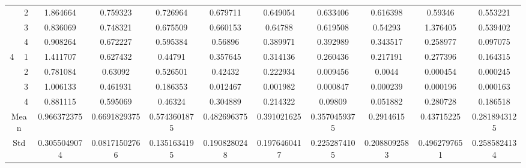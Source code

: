 \documentclass[draft,dvipsnames]{drexel-thesis}
\begin{document}
\begin{thesis}
\begin{table}[!t]
{\begin{tabular}{|c|c|c|c|c|c|c|c|c|c|c|}
                      & 2                   & 1.864664     & 0.759323      & 0.726964     & 0.679711     & 0.649054     & 0.633406     & 0.616398     & 0.59346      & 0.553221     \\ \cline{2-11}
                      & 3                   & 0.836069     & 0.748321      & 0.675509     & 0.660153     & 0.64788      & 0.619508     & 0.54293      & 1.376405     & 0.539402     \\ \cline{2-11}
                      & 4                   & 0.908264     & 0.672227      & 0.595384     & 0.56896      & 0.389971     & 0.392989     & 0.343517     & 0.258977     & 0.097075     \\ \hline
\multirow{4}{*}{4}    & 1                   & 1.411707     & 0.627432      & 0.44791      & 0.357645     & 0.314136     & 0.260436     & 0.217191     & 0.277396     & 0.164315     \\ \cline{2-11}
                      & 2                   & 0.781084     & 0.63092       & 0.526501     & 0.42432      & 0.222934     & 0.009456     & 0.0044       & 0.000454     & 0.000245     \\ \cline{2-11}
                      & 3                   & 1.006133     & 0.461931      & 0.186353     & 0.012467     & 0.001982     & 0.000847     & 0.000239     & 0.000196     & 0.000163     \\ \cline{2-11}
                      & 4                   & 0.881115     & 0.595069      & 0.46324      & 0.304889     & 0.214322     & 0.09809      & 0.051882     & 0.280728     & 0.186518     \\ \hline
\multicolumn{2}{|c|}{Mean}                  & 0.966372375  & 0.6691829375  & 0.5743601875 & 0.482696375  & 0.391021625  & 0.3570459375 & 0.2914615    & 0.43715225   & 0.2818943125 \\ \hline
\multicolumn{2}{|c|}{Std}                   & 0.3055049074 & 0.08171502766 & 0.1351634195 & 0.1908280248 & 0.1976460417 & 0.2252874105 & 0.2088092583 & 0.4962797651 & 0.2585824134 \\ \hline
\end{tabular}}
\end{table}


\end{thesis}
\end{document}

